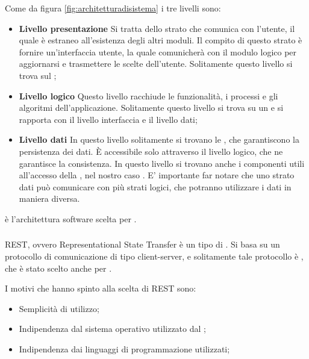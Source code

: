 Come da figura \ref{fig:architetturadisistema} i tre livelli sono:
\begin{itemize}
\item \textbf{Livello presentazione} Si tratta dello strato che comunica con l'utente, il quale è estraneo all'esistenza degli altri moduli. Il compito di questo strato è fornire un'interfaccia utente, la quale comunicherà con il modulo logico per aggiornarsi e trasmettere le scelte dell'utente. Solitamente questo livello si trova sul ;
\item \textbf{Livello logico} Questo livello racchiude le funzionalità, i processi e gli algoritmi dell'applicazione. Solitamente questo livello si trova su un  e si rapporta con il livello interfaccia e il livello dati; 
\item \textbf{Livello dati} In questo livello solitamente si trovano le , che garantiscono la persistenza dei dati. È accessibile solo attraverso il livello logico, che ne garantisce la consistenza. In questo livello si trovano anche i componenti utili all'accesso della , nel nostro caso .
E' importante far notare che uno strato dati può comunicare con più strati logici, che potranno utilizzare i dati in maniera diversa.
\end{itemize}

 è l'architettura software scelta per \ProjectName.

\subsubsection{}

REST, ovvero Representational State Transfer è un tipo di . Si basa su un protocollo di comunicazione  di tipo client-server, e solitamente tale protocollo è , che è stato scelto anche per \ProjectName.

I motivi che hanno spinto alla scelta di REST sono:
\begin{itemize}
\item Semplicità di utilizzo;
\item Indipendenza dal sistema operativo utilizzato dal ;
\item Indipendenza dai linguaggi di programmazione utilizzati;
\end{itemize}

